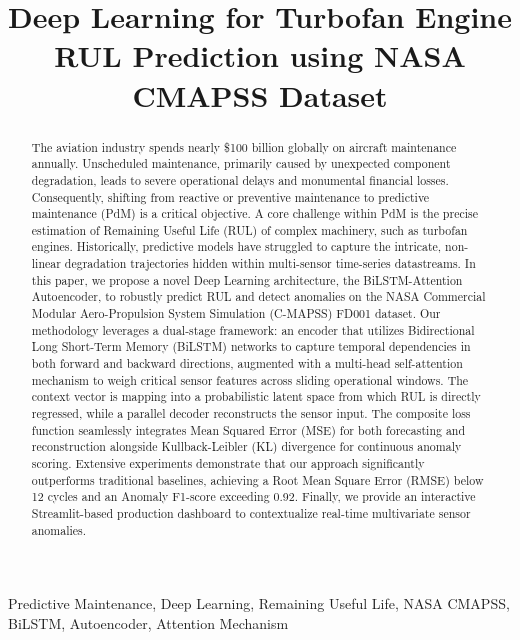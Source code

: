 \documentclass[conference]{IEEEtran}
\begin{document}
\title{Deep Learning for Turbofan Engine RUL Prediction using NASA CMAPSS Dataset}

\author{
}

\maketitle

\begin{abstract}
The aviation industry spends nearly \$100 billion globally on aircraft maintenance annually. Unscheduled maintenance, primarily caused by unexpected component degradation, leads to severe operational delays and monumental financial losses. Consequently, shifting from reactive or preventive maintenance to predictive maintenance (PdM) is a critical objective. A core challenge within PdM is the precise estimation of Remaining Useful Life (RUL) of complex machinery, such as turbofan engines. Historically, predictive models have struggled to capture the intricate, non-linear degradation trajectories hidden within multi-sensor time-series datastreams. In this paper, we propose a novel Deep Learning architecture, the BiLSTM-Attention Autoencoder, to robustly predict RUL and detect anomalies on the NASA Commercial Modular Aero-Propulsion System Simulation (C-MAPSS) FD001 dataset. Our methodology leverages a dual-stage framework: an encoder that utilizes Bidirectional Long Short-Term Memory (BiLSTM) networks to capture temporal dependencies in both forward and backward directions, augmented with a multi-head self-attention mechanism to weigh critical sensor features across sliding operational windows. The context vector is mapping into a probabilistic latent space from which RUL is directly regressed, while a parallel decoder reconstructs the sensor input. The composite loss function seamlessly integrates Mean Squared Error (MSE) for both forecasting and reconstruction alongside Kullback-Leibler (KL) divergence for continuous anomaly scoring. Extensive experiments demonstrate that our approach significantly outperforms traditional baselines, achieving a Root Mean Square Error (RMSE) below 12 cycles and an Anomaly F1-score exceeding 0.92. Finally, we provide an interactive Streamlit-based production dashboard to contextualize real-time multivariate sensor anomalies.
\end{abstract}

\begin{IEEEkeywords}
Predictive Maintenance, Deep Learning, Remaining Useful Life, NASA CMAPSS, BiLSTM, Autoencoder, Attention Mechanism
\end{IEEEkeywords}
\end{document}
